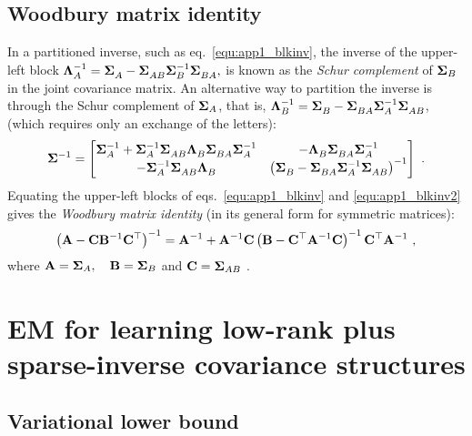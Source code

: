 
    \subsection{Woodbury matrix identity} \label{subsec:app1_Woodbury}
      In a partitioned inverse, such as eq.~\eqref{equ:app1_blkinv}, the inverse of the upper-left block
      $\mathbf{\Lambda}^{-1}_A = \mathbf{\Sigma}^{~}_A - \mathbf{\Sigma}_{AB}^{~} \mathbf{\Sigma}^{-1}_B \mathbf{\Sigma}_{BA}^{~}, $
      is known as the \textit{Schur complement} of $\mathbf{\Sigma}_B$ in the joint covariance matrix.
      An alternative way to partition the inverse is through the Schur complement of $\mathbf{\Sigma}_A$,
      that is, $\mathbf{\Lambda}^{-1}_B = \mathbf{\Sigma}^{~}_B - \mathbf{\Sigma}_{BA}^{~} \mathbf{\Sigma}^{-1}_A \mathbf{\Sigma}_{AB}^{~}$,
      (which requires only an exchange of the letters):
      \begin{equation} \label{equ:app1_blkinv2}
	\mathbf{\Sigma}^{-1}
	= \begin{bmatrix}  \mathbf{\Sigma}^{-1}_A + \mathbf{\Sigma}^{-1}_A \mathbf{\Sigma}^{~}_{AB}\mathbf{\Lambda}^{~}_B\mathbf{\Sigma}^{~}_{BA}\mathbf{\Sigma}^{-1}_A  &-\mathbf{\Lambda}^{~}_B\mathbf{\Sigma}^{~}_{BA}\mathbf{\Sigma}^{-1}_{A} \\
	-\mathbf{\Sigma}_A^{-1}\mathbf{\Sigma}_{AB}^{~}\mathbf{\Lambda}_{B}^{~} & \left(\mathbf{\Sigma}_B^{~} - \mathbf{\Sigma}_{BA}^{~} \mathbf{\Sigma}_A^{-1} \mathbf{\Sigma}_{AB}^{~}\right)^{-1}  \end{bmatrix} ~.
      \end{equation}
      Equating the upper-left blocks of eqs.~\eqref{equ:app1_blkinv} and \eqref{equ:app1_blkinv2}
      gives the \textit{Woodbury matrix identity} (in its general form for symmetric matrices):
      \begin{equation}
	\left(\mathbf{A} - \mathbf{C} \mathbf{B}^{-1} \mathbf{C}^\top \right)^{-1}
	= \mathbf{A}^{-1} + \mathbf{A}^{-1} \mathbf{C} \left( \mathbf{B} - \mathbf{C}^\top \mathbf{A}^{-1} \mathbf{C} \right)^{-1} \mathbf{C}^\top \mathbf{A}^{-1} ~,
      \end{equation}
      where \quad $\mathbf{A} = \mathbf{\Sigma}_{A}, \quad \mathbf{B} = \mathbf{\Sigma}_B$ \quad and \quad $\mathbf{C} = \mathbf{\Sigma}_{AB}~$.




  \section{EM for learning low-rank plus sparse-inverse covariance structures} \label{sec:app1_EM_forLRSI}

    \subsection{Variational lower bound}


